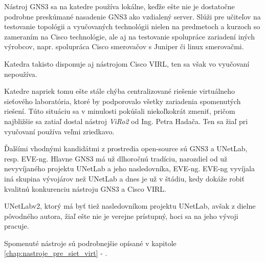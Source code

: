 Nástroj GNS3 sa na katedre používa lokálne, keďže ešte nie je dostatočne podrobne preskúmané nasadenie GNS3 ako vzdialený server. Slúži pre učiteľov na testovanie topológii a vyučovaných technológii nielen na predmetoch a kurzoch so zameraním na Cisco technológie, ale aj na testovanie spolupráce zariadení iných výrobcov, napr. spolupráca Cisco smerovačov s Juniper či linux smerovačmi.

Katedra takisto disponuje aj nástrojom Cisco VIRL, ten sa však vo vyučovaní nepoužíva.

Katedre napriek tomu ešte stále chýba centralizované riešenie virtuálneho sieťového laboratória, ktoré by podporovalo všetky zariadenia spomenutých riešení. Túto situáciu sa v minulosti pokúšali niekoľkokrát zmeniť, pričom najbližšie sa zatiaľ dostal nástroj \emph{ViRo2} od Ing. Petra Hadača. Ten sa žiaľ pri vyučovaní používa veľmi zriedkavo.

Ďalšími vhodnými kandidátmi z prostredia open-source sú GNS3 a UNetLab, resp. EVE-ng. Hlavne GNS3 má už dlhoročnú tradíciu, narozdiel od už nevyvíjaného projektu UNetLab a jeho nasledovníka, EVE-ng. EVE-ng vyvíjala iná skupina vývojárov než UNetLab a dnes je už v štádiu, kedy dokáže robiť kvalitnú konkurenciu nástroju GNS3 a Cisco VIRL.

UNetLabv2, ktorý má byť tiež nasledovníkom projektu UNetLab, avšak z dielne pôvodného autora, žiaľ ešte nie je verejne prístupný, hoci sa na jeho vývoji pracuje.

Spomenuté nástroje sú podrobnejšie opísané v kapitole \ref{chap:nastroje_pre_siet_virt} - .